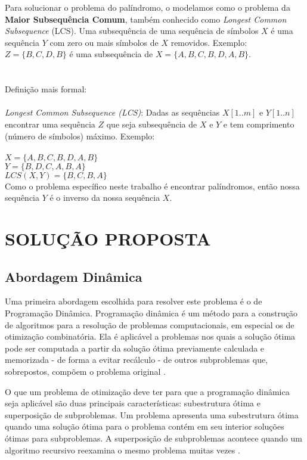 \documentclass[12pt]{article}
\begin{document}
	Para solucionar o problema do palíndromo, o modelamos como o problema da \textbf{Maior Subsequência Comum}, também conhecido como \textit{Longest Common Subsequence} (LCS). Uma subsequência de uma sequência de símbolos $X$ é uma sequência $Y$ com zero ou mais símbolos de $X$ removidos. Exemplo: $Z = \{B, C, D, B\}$ é uma subsequência de $X = \{A, B, C, B, D, A, B\}$.
	\\
	\\
	\\
	Definição mais formal:\\
	\\
	\textit{Longest Common Subsequence (LCS)}: Dadas as sequências $X [1..m]$ e $Y [1..n]$ encontrar uma sequência $Z$ que seja subsequência de $X$ e $Y$ e tem comprimento (número de símbolos) máximo. Exemplo:\\
	\\
	$X = \{A, B, C, B, D, A, B\}$\\
	$Y = \{B, D, C, A, B, A\}$\\
	$LCS (X,Y) = \{B, C, B, A\}$\\

	Como o problema específico neste trabalho é encontrar palíndromos, então nossa sequência $Y$ é o inverso da nossa sequência $X$.

\section{SOLUÇÃO PROPOSTA}
\label{solucao_proposta}

\subsection{Abordagem Dinâmica}
\label{dinamica}

    Uma primeira abordagem escolhida para resolver este problema é o de Programação Dinâmica. Programação dinâmica é um método para a construção de algoritmos para a resolução de problemas computacionais, em especial os de otimização combinatória. Ela é aplicável a problemas nos quais a solução ótima pode ser computada a partir da solução ótima previamente calculada e memorizada - de forma a evitar recálculo - de outros subproblemas que, sobrepostos, compõem o problema original \cite{szwarccfiter}.

    O que um problema de otimização deve ter para que a programação dinâmica seja aplicável são duas principais características: subestrutura ótima e superposição de subproblemas. Um problema apresenta uma subestrutura ótima quando uma solução ótima para o problema contém em seu interior soluções ótimas para subproblemas. A superposição de subproblemas acontece quando um algoritmo recursivo reexamina o mesmo problema muitas vezes \cite{szwarccfiter}.
\end{document}

